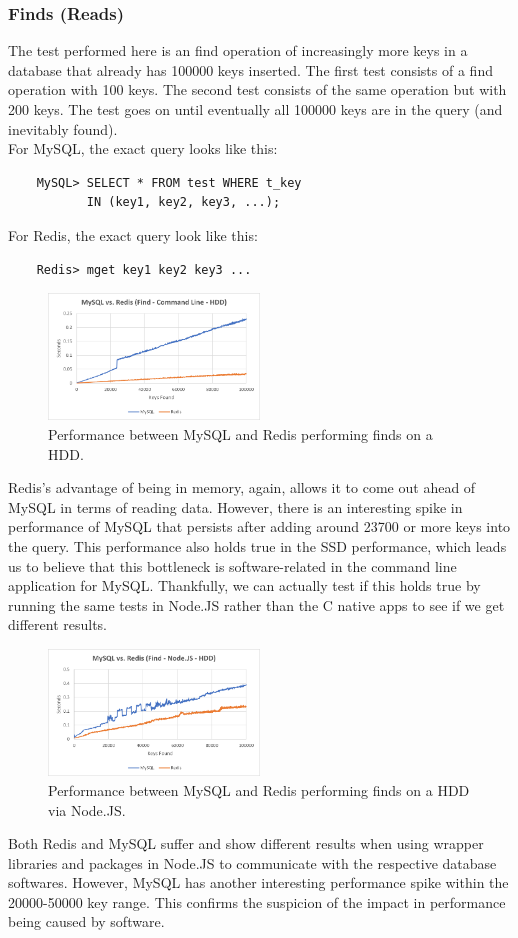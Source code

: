 \documentclass[letterpaper, 10 pt, conference]{ieeeconf}
\begin{document}
\subsubsection{Finds (Reads)}
The test performed here is an find operation of increasingly more keys in a database that already has 100000 keys inserted. The first test consists of a find operation with 100 keys. The second test consists of the same operation but with 200 keys. The test goes on until eventually all 100000 keys are in the query (and inevitably found). \\
For MySQL, the exact query looks like this:
\begin{verbatim}
    MySQL> SELECT * FROM test WHERE t_key
           IN (key1, key2, key3, ...);
\end{verbatim}
For Redis, the exact query look like this:
\begin{verbatim}
    Redis> mget key1 key2 key3 ...
\end{verbatim}
\begin{figure}[h]
    \centering
    \includegraphics[width=0.5\textwidth]{3.png}
    \caption{Performance between MySQL and Redis performing finds on a HDD.}
    \label{fig:mesh1}
\end{figure}
Redis's advantage of being in memory, again, allows it to come out ahead of MySQL in terms of reading data. However, there is an interesting spike in performance of MySQL that persists after adding around 23700 or more keys into the query. This performance also holds true in the SSD performance, which leads us to believe that this bottleneck is software-related in the command line application for MySQL. Thankfully, we can actually test if this holds true by running the same tests in Node.JS rather than the C native apps to see if we get different results.
\begin{figure}[h]
    \centering
    \includegraphics[width=0.5\textwidth]{4.png}
    \caption{Performance between MySQL and Redis performing finds on a HDD via Node.JS.}
    \label{fig:mesh1}
\end{figure}
Both Redis and MySQL suffer and show different results when using wrapper libraries and packages in Node.JS to communicate with the respective database softwares. However, MySQL has another interesting performance spike within the 20000-50000 key range. This confirms the suspicion of the impact in performance being caused by software.
\end{document}
